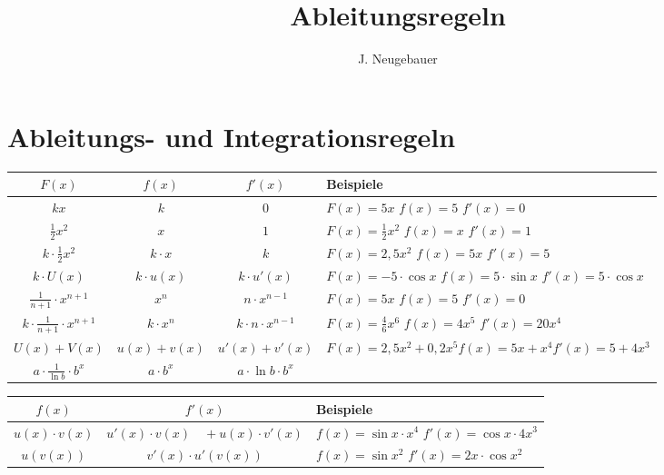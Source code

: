 \documentclass[10pt, a4paper, landscape, twocolumn]{scrartcl}
\author{J. Neugebauer}
\title{Ableitungsregeln}
\date{\Heute}
\begin{document}
	\section*{Ableitungs- und Integrationsregeln}
	\begin{tabularx}{\columnwidth}{c|c|c|X}
		$F(x)$ & $f(x)$ & $f'(x)$ & Beispiele \\ \hline\hline
		$kx$ & $k$ & $0$ &\small
			$F(x) = 5x$ \newline $f(x) = 5$ \newline $f'(x) = 0$ \\ \hline
		$\frac{1}{2}x^2$ & $x$ & $1$ &\small
			$F(x) = \frac{1}{2}x^2$ \newline $f(x) = x$ \newline $f'(x) = 1$ \\ \hline
		$k\cdot \frac{1}{2}x^2$ & $k\cdot x$ & $k$ &\small
			$F(x) = 2,5x^2$ \newline $f(x) = 5x$ \newline $f'(x) = 5$ \\ \hline
		$k\cdot U(x)$ & $k\cdot u(x)$ & $k\cdot u'(x)$ &\small
			$F(x)=-5\cdot\cos{x}$ \newline $f(x) = 5\cdot\sin{x}$ \newline $f'(x) = 5\cdot\cos{x}$ \\ \hline
		$\frac{1}{n+1}\cdot x^{n+1}$ & $x^n$ & $n\cdot x^{n-1}$ &\small
			$F(x) = 5x$ \newline $f(x) = 5$ \newline $f'(x) = 0$ \\ \hline
		$k\cdot \frac{1}{n+1}\cdot x^{n+1}$ & $k\cdot x^n$ & $k\cdot n\cdot x^{n-1}$ &\small
			$F(x) = \frac{4}{6}x^6$ \newline $f(x) = 4x^5$ \newline $f'(x) = 20x^4$ \\ \hline
		$U(x)+V(x)$ & $u(x)+v(x)$ & $u'(x)+v'(x)$
			& \small $F(x) = 2,5x^2 + 0,2x^5$\newline $f(x) = 5x+x^4$\newline $f'(x) = 5+4x^3$ \\ \hline	
		$a\cdot \frac{1}{\ln{b}}\cdot b^x$ & $a\cdot b^x$ & $a\cdot\ln{b}\cdot b^x$ &\small
			
	\end{tabularx}

	\newpage
	
	\begin{tabularx}{\columnwidth}{c|c|X}
		$f(x)$ & $f'(x)$ & Beispiele \\ \hline\hline
		$u(x)\cdot v(x)$ & $u'(x)\cdot v(x) \quad + u(x)\cdot v'(x)$ &\small
			$f(x) = \sin{x}\cdot x^4$ \newline $f'(x) = \cos{x}\cdot 4x^3$ \\ \hline
		$u(v(x))$ & $v'(x)\cdot u'(v(x))$ &\small
			$f(x) = \sin{x^2}$ \newline $f'(x) = 2x\cdot\cos{x^2}$
	\end{tabularx}
\end{document}
